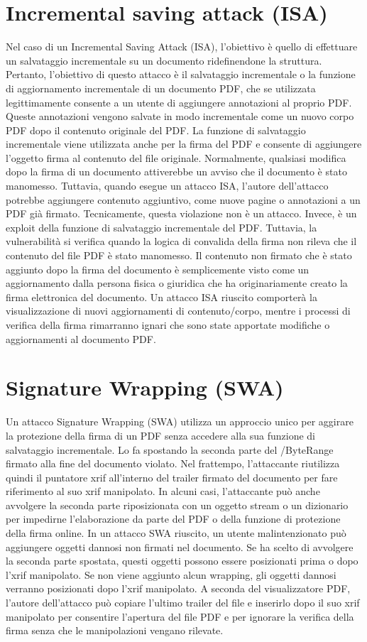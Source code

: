 \section{Incremental saving attack (ISA)}
Nel caso di un Incremental Saving Attack (ISA), l'obiettivo è quello di effettuare un salvataggio incrementale su un documento ridefinendone la struttura. Pertanto, l'obiettivo di questo attacco è il salvataggio incrementale o la funzione di aggiornamento incrementale di un documento PDF, che se utilizzata legittimamente consente a un utente di aggiungere annotazioni al proprio PDF. Queste annotazioni vengono salvate in modo incrementale come un nuovo corpo PDF dopo il contenuto originale del PDF. La funzione di salvataggio incrementale viene utilizzata anche per la firma del PDF e consente di aggiungere l'oggetto firma al contenuto del file originale. Normalmente, qualsiasi modifica dopo la firma di un documento attiverebbe un avviso che il documento è stato manomesso. Tuttavia, quando esegue un attacco ISA, l'autore dell'attacco potrebbe aggiungere contenuto aggiuntivo, come nuove pagine o annotazioni a un PDF già firmato. Tecnicamente, questa violazione non è un attacco. Invece, è un exploit della funzione di salvataggio incrementale del PDF. Tuttavia, la vulnerabilità si verifica quando la logica di convalida della firma non rileva che il contenuto del file PDF è stato manomesso. Il contenuto non firmato che è stato aggiunto dopo la firma del documento è semplicemente visto come un aggiornamento dalla persona fisica o giuridica che ha originariamente creato la firma elettronica del documento. Un attacco ISA riuscito comporterà la visualizzazione di nuovi aggiornamenti di contenuto/corpo, mentre i processi di verifica della firma rimarranno ignari che sono state apportate modifiche o aggiornamenti al documento PDF.

\section{Signature Wrapping (SWA)}

Un attacco Signature Wrapping (SWA) utilizza un approccio unico per aggirare la protezione della firma di un PDF senza accedere alla sua funzione di salvataggio incrementale. Lo fa spostando la seconda parte del /ByteRange firmato alla fine del documento violato. Nel frattempo, l'attaccante riutilizza quindi il puntatore xrif all'interno del trailer firmato del documento per fare riferimento al suo xrif manipolato. In alcuni casi, l'attaccante può anche avvolgere la seconda parte riposizionata con un oggetto stream o un dizionario per impedirne l'elaborazione da parte del PDF o della funzione di protezione della firma online. In un attacco SWA riuscito, un utente malintenzionato può aggiungere oggetti dannosi non firmati nel documento. Se ha scelto di avvolgere la seconda parte spostata, questi oggetti possono essere posizionati prima o dopo l'xrif manipolato. Se non viene aggiunto alcun wrapping, gli oggetti dannosi verranno posizionati dopo l'xrif manipolato. A seconda del visualizzatore PDF, l'autore dell'attacco può copiare l'ultimo trailer del file e inserirlo dopo il suo xrif manipolato per consentire l'apertura del file PDF e per ignorare la verifica della firma senza che le manipolazioni vengano rilevate.

